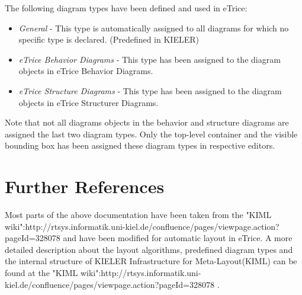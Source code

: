 The following diagram types have been defined and used in eTrice:
\begin{itemize}
\item \textit{General} - This type is automatically assigned to all diagrams for which no specific type is declared. (Predefined in KIELER)
\item \textit{eTrice Behavior Diagrams} - This type has been assigned to the diagram objects in eTrice Behavior Diagrams. 
\item \textit{eTrice Structure Diagrams} - This type has been assigned to the diagram objects in eTrice Structurer Diagrams.
\end{itemize}
Note that not all diagrams objects in the behavior and structure diagrams are assigned the last two diagram types. Only the top-level container and the visible bounding box has been assigned these diagram types in respective editors.

\section{Further References}

Most parts of the above documentation have been taken from the "KIML wiki":http://rtsys.informatik.uni-kiel.de/confluence/pages/viewpage.action?pageId=328078 and have been modified for automatic layout in eTrice. A more detailed description about the layout algorithms, predefined diagram types and the internal structure of KIELER Infrastructure for Meta-Layout(KIML) can be found at the "KIML wiki":http://rtsys.informatik.uni-kiel.de/confluence/pages/viewpage.action?pageId=328078 .